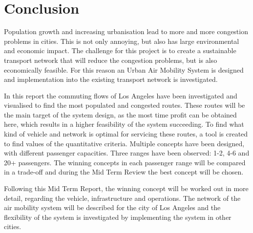 \newpage
\chapter{Conclusion}
\label{Conclusion}

Population growth and increasing urbanisation lead to more and more congestion problems in cities. This is not only annoying, but also has large environmental and economic impact. The challenge for this project is to create a sustainable transport network that will reduce the congestion problems, but is also economically feasible. For this reason an Urban Air Mobility System is designed and implementation into the existing transport network is investigated. 

In this report the commuting flows of Los Angeles have been investigated and visualised to find the most populated and congested routes. These routes will be the main target of the system design, as the most time profit can be obtained here, which results in a higher feasibility of the system succeeding. To find what kind of vehicle and network is optimal for servicing these routes, a tool is created to find values of the quantitative criteria. Multiple concepts have been designed, with different passenger capacities. Three ranges have been observed: 1-2, 4-6 and 20+ passengers. The winning concepts in each passenger range will be compared in a trade-off and during the Mid Term Review the best concept will be chosen. 

Following this Mid Term Report, the winning concept will be worked out in more detail, regarding the vehicle, infrastructure and operations. The network of the air mobility system will be described for the city of Los Angeles and the flexibility of the system is investigated by implementing the system in other cities. 